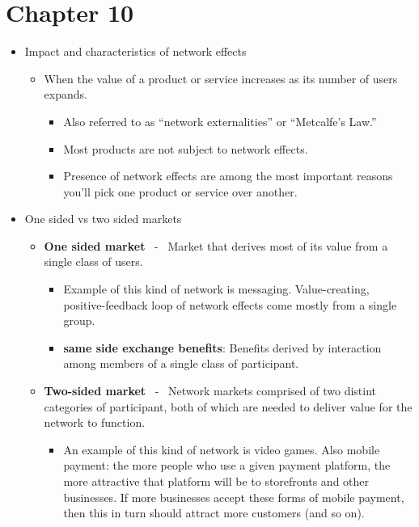 \documentclass{report}
\begin{document}
\chapter*{Chapter 10}
\begin{itemize}
    \item Impact and characteristics of network effects
        \begin{itemize}[label=$\circ$]
            \item When the value of a product or service increases as its number of users expands.
                \begin{itemize}[label=$\circ$]
                    \item Also referred to as ``network externalities'' or ``Metcalfe's Law.''
                    \item Most products are not subject to network effects.
                    \item Presence of network effects are among the most important reasons you'll pick one product or service over another.
                \end{itemize}
        \end{itemize}
    \item One sided vs two sided markets
        \begin{itemize}[label=$\circ$]
            \item \textbf{One sided market} \ - \ Market that derives most of its value from a single class of users.
                \begin{itemize}[label=$\circ$]
                    \item Example of this kind of network is messaging. Value-creating, positive-feedback loop of network effects come mostly from a single group.
                    \item \textbf{same side exchange benefits}: Benefits derived by interaction among members of a single class of participant.
                \end{itemize}
            \item \textbf{Two-sided market} \ - \ Network markets comprised of two distint categories of participant, both of which are needed to deliver value for the network to function.
                \begin{itemize}[label=$\circ$]
                    \item An example of this kind of network is video games. Also mobile payment: the more people who use a given payment platform, the more attractive that platform will be to storefronts and other businesses. If more businesses accept these forms of mobile payment, then this in turn should attract more customers (and so on).

\end{itemize}
\end{itemize}
\end{itemize}
\end{document}
